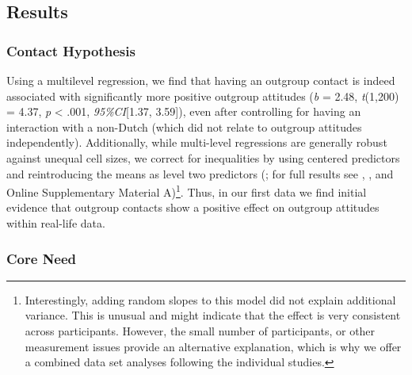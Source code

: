 \subsection{Results}

\subsubsection{Contact Hypothesis}

Using a multilevel regression, we find that having an outgroup contact
is indeed associated with significantly more positive outgroup attitudes
(\textit{b} = 2.48, \textit{t}(1,200) = 4.37, \textit{p} \textless{}
.001, \textit{95\%CI}{[}1.37, 3.59{]}), even after controlling for
having an interaction with a non-Dutch (which did not relate to outgroup
attitudes independently). Additionally, while multi-level regressions
are generally robust against unequal cell sizes, we correct for
inequalities by using centered predictors and reintroducing the means as
level two predictors (\citealp{Yaremych2021}; for full results see
, ,
and Online Supplementary Material
A)\footnote{Interestingly, adding random slopes to this model did not explain additional variance. This is unusual and might indicate that the effect is very consistent across participants. However, the small number of participants, or other measurement issues provide an alternative explanation, which is why we offer a combined data set analyses following the individual studies.}.
Thus, in our first data we find initial evidence that outgroup contacts
show a positive effect on outgroup attitudes within real-life data.

\subsubsection{Core Need}

